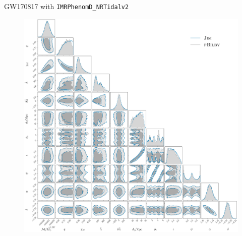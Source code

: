 \documentclass[usenames,dvipsnames,t]{beamer}
\begin{document}
\begin{frame}{GW170817 with \texttt{IMRPhenomD\_NRTidalv2}}
  \vspace{-4.5mm}
  \begin{figure}
  
  \begin{minipage}[c]{0.2\textwidth}
    \caption{}\label{fig: GW170817 NRTidalv2}
    \end{minipage}\hfill
    \begin{minipage}[c]{0.8\textwidth}
    \includegraphics[scale = 0.132]{Figures/GW170817_NRTidalv2.pdf}
    \end{minipage}
  \end{figure}
\end{frame}
\end{document}
